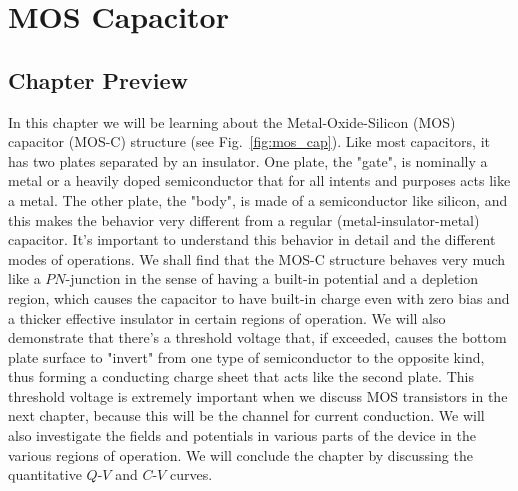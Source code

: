 \chapter{MOS Capacitor}
\label{ch:ch07_mos_c}
\graphicspath{{./figs_MOS_C/}}
\section{Chapter Preview}
In this chapter we will be learning about the Metal-Oxide-Silicon (MOS) capacitor (MOS-C) structure (see Fig.~\ref{fig:mos_cap}).  Like most capacitors, it has two plates separated by an insulator.  One plate, the "gate",  is nominally a metal or a heavily doped semiconductor that for all intents and purposes acts like a metal.  The other plate, the "body",  is made of a semiconductor like silicon, and this makes the behavior very different from a regular (metal-insulator-metal) capacitor. It's important to understand this behavior in detail and the different modes of operations.   We shall find that the MOS-C structure behaves very much like a $PN$-junction in the sense of having a built-in potential and a depletion region, which causes the capacitor to have built-in charge even with zero bias and a thicker effective insulator in certain regions of operation.  We will also demonstrate that there's a threshold voltage that, if exceeded, causes the bottom plate surface to "invert" from one type of semiconductor to the opposite kind, thus forming a conducting charge sheet that acts like the second plate.  This threshold voltage is extremely important when we discuss MOS transistors in the next chapter, because this will be the channel for current conduction.  We will also investigate the fields and potentials in various parts of the device in the various regions of operation.  We will conclude the chapter by discussing the quantitative  $Q$-$V$ and $C$-$V$ curves.
